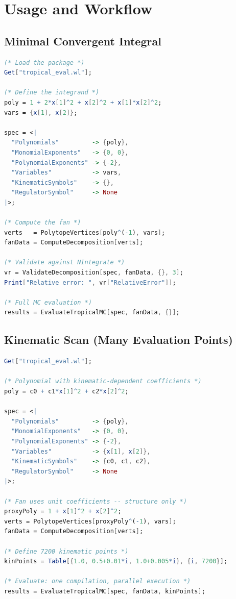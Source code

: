 \documentclass[11pt,a4paper]{article}
\begin{document}
\section{Usage and Workflow}

\subsection{Minimal Convergent Integral}

\begin{lstlisting}[language=Mathematica]
(* Load the package *)
Get["tropical_eval.wl"];

(* Define the integrand *)
poly = 1 + 2*x[1]^2 + x[2]^2 + x[1]*x[2]^2;
vars = {x[1], x[2]};

spec = <|
  "Polynomials"         -> {poly},
  "MonomialExponents"   -> {0, 0},
  "PolynomialExponents" -> {-2},
  "Variables"           -> vars,
  "KinematicSymbols"    -> {},
  "RegulatorSymbol"     -> None
|>;

(* Compute the fan *)
verts   = PolytopeVertices[poly^(-1), vars];
fanData = ComputeDecomposition[verts];

(* Validate against NIntegrate *)
vr = ValidateDecomposition[spec, fanData, {}, 3];
Print["Relative error: ", vr["RelativeError"]];

(* Full MC evaluation *)
results = EvaluateTropicalMC[spec, fanData, {}];
\end{lstlisting}

\subsection{Kinematic Scan (Many Evaluation Points)}

\begin{lstlisting}[language=Mathematica]
Get["tropical_eval.wl"];

(* Polynomial with kinematic-dependent coefficients *)
poly = c0 + c1*x[1]^2 + c2*x[2]^2;

spec = <|
  "Polynomials"         -> {poly},
  "MonomialExponents"   -> {0, 0},
  "PolynomialExponents" -> {-2},
  "Variables"           -> {x[1], x[2]},
  "KinematicSymbols"    -> {c0, c1, c2},
  "RegulatorSymbol"     -> None
|>;

(* Fan uses unit coefficients -- structure only *)
proxyPoly = 1 + x[1]^2 + x[2]^2;
verts = PolytopeVertices[proxyPoly^(-1), vars];
fanData = ComputeDecomposition[verts];

(* Define 7200 kinematic points *)
kinPoints = Table[{1.0, 0.5+0.01*i, 1.0+0.005*i}, {i, 7200}];

(* Evaluate: one compilation, parallel execution *)
results = EvaluateTropicalMC[spec, fanData, kinPoints];
\end{lstlisting}
\end{document}
